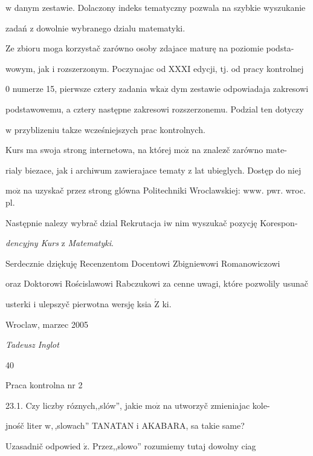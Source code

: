 \documentclass[a4paper,12pt]{article}
\begin{document}
$\mathrm{w}$ danym zestawie. Dolaczony indeks tematyczny pozwala na szybkie wyszukanie

zadań $\mathrm{z}$ dowolnie wybranego dzialu matematyki.

Ze zbioru moga korzystač zarówno osoby zdajace maturę na poziomie podsta-

wowym, jak $\mathrm{i}$ rozszerzonym. Poczynajac od XXXI edycji, $\mathrm{t}\mathrm{j}$. od pracy kontrolnej

$0$ numerze 15, pierwsze cztery zadania $\mathrm{w}\mathrm{k}\mathrm{a}\dot{\mathrm{z}}$ dym zestawie odpowiadaja zakresowi

podstawowemu, a cztery następne zakresowi rozszerzonemu. Podzial ten dotyczy

$\mathrm{w}$ przyblizeniu takze wcześniejszych prac kontrolnych.

Kurs ma swoja strong internetowa, na której $\mathrm{m}\mathrm{o}\dot{\mathrm{z}}$ na znalez$\acute{}$č zarówno mate-

rialy biezace, jak $\mathrm{i}$ archiwum zawierajace tematy $\mathrm{z}$ lat ubieglych. Dostęp do niej

$\mathrm{m}\mathrm{o}\dot{\mathrm{z}}$ na uzyskač przez strong glówna Politechniki Wroclawskiej: $\mathrm{w}\mathrm{w}\mathrm{w}$. pwr. wroc. pl.

Następnie nalezy wybrač dzial Rekrutacja $\mathrm{i}\mathrm{w}$ nim wyszukač pozycję Korespon-

{\it dencyjny Kurs} $\mathrm{z}$ {\it Matematyki}.

Serdecznie dziękuję Recenzentom Docentowi Zbigniewowi Romanowiczowi

oraz Doktorowi Rościslawowi Rabczukowi za cenne uwagi, które pozwolily usunač

usterki $\mathrm{i}$ ulepszyč pierwotna wersję ksia $\dot{\mathrm{Z}}$ ki.

Wroclaw, marzec 2005

{\it Tadeusz Inglot}





40

Praca kontrolna nr 2

23.1. Czy liczby róznych,,slów'', jakie $\mathrm{m}\mathrm{o}\dot{\mathrm{z}}$ na utworzyč zmieniajac kole-

jnośč liter $\mathrm{w},$,slowach'' TANATAN $\mathrm{i}$ AKABARA, sa takie same?

Uzasadnič odpowied $\acute{\mathrm{z}}$. Przez,,slowo'' rozumiemy tutaj dowolny ciag
\end{document}
